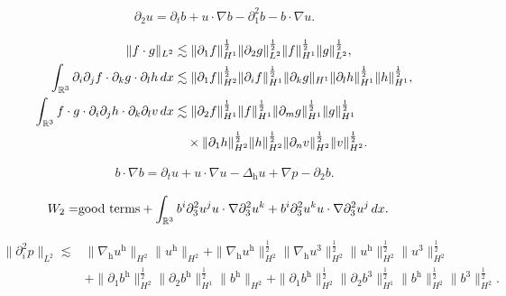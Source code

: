 \documentclass[10pt,a4paper]{amsart}
\newcommand{\R}{\mathbb{R}}
\newcommand{\dx}{\,{\rm d}x}
\newcommand{\h}{\mathrm{h}}
\newcommand{\nablah}{\nabla_{\mathrm{h}}}
\begin{document}
\begin{align}\label{ha}
	\partial_2 u = \partial_t b + u\cdot\nabla b - \partial_1^2 b - b\cdot\nabla u.
\end{align}

	\begin{align} \label{yi}
		\|f\cdot g\|_{L^2}&\lesssim\|\partial_1 f\|_{H^1}^\frac12\|\partial_2 g\|_{L^2}^\frac12\|f\|_{H^1}^\frac12\|g\|_{L^2}^\frac12,\\
		\label{er}\int_{\R^3}\partial_i\partial_jf\cdot\partial_kg\cdot\partial_lh\dx&\lesssim\|\partial_1f\|_{H^2}^\frac12\|\partial_if\|_{H^1}^\frac12\|\partial_kg\|_{H^1}\|\partial_lh\|_{H^1}^\frac12\|h\|_{H^1}^\frac12,\\\label{san}
		\int_{\R^3}f\cdot g\cdot\partial_i\partial_jh\cdot\partial_k\partial_lv\dx&\lesssim\|\partial_2f\|_{H^1}^\frac12\|f\|_{H^1}^\frac12\|\partial_mg\|_{H^1}^\frac12\|g\|_{H^1}^\frac12\nonumber\\
		&\quad \times\|\partial_1h\|_{H^2}^\frac12\|h\|_{H^2}^\frac12\|\partial_nv\|_{H^2}^\frac12\|v\|_{H^2}^\frac12.
	\end{align}

\begin{align}\label{bbbb}
	b\cdot\nabla b=\partial_tu+u\cdot\nabla u-\Delta_\h u+\nabla p-\partial_2b.
\end{align}

\begin{align}\label{W2}
	W_2=&\text{good terms}+\int_{\mathbb{R}^3} b^i \partial_3^2 u^j u\cdot\nabla\partial_3^2 u^k  +  b^i \partial_3^2 u^k u\cdot\nabla\partial_3^2 u^j \dx.
\end{align}

\begin{align}\label{P_H2}
	\|\partial_{i}^2p\|_{L^2}\lesssim&\|\nablah u^\h\|_{H^2}\|u^\h\|_{H^2}+ \|\nablah u^\h\|_{H^2}^\frac12\|\nablah u^3\|_{H^2}^\frac12\|u^\h\|_{H^2}^\frac12\|u^3\|_{H^2}^\frac12 \nonumber\\
	&+\|\partial_1b^\h\|_{H^2}^\frac12\|\partial_2b^\h\|_{H^1}^\frac12\|b^\h\|_{H^2}+\|\partial_1b^\h\|_{H^2}^\frac12\|\partial_2b^3\|_{H^1}^\frac12\|b^\h\|_{H^2}^\frac12\|b^3\|_{H^2}^\frac12.
\end{align}
\end{document}
